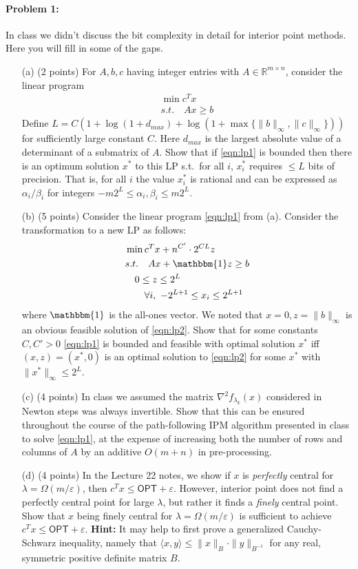 \documentclass[12pt]{article}
\newcommand{\inprod}[1]{\langle #1 \rangle}
\newcommand{\R}{\mathbb{R}}
\begin{document}
\paragraph{Problem 1:} In class we didn't discuss the bit complexity in detail for interior point methods. Here you will fill in some of the gaps.
\begin{itemize}
\item[(a)] (2 points) For $A, b, c$ having integer entries with $A\in\R^{m\times n}$, consider the linear program
\begin{eqnarray}
\nonumber \min c^T x  \\
s.t. \quad Ax \ge b \label{eqn:lp1}
\end{eqnarray}
Define $L = C(1 + \log(1 + d_{max}) + \log(1 + \max\{\|b\|_\infty, \|c\|_\infty\}))$ for sufficiently large constant $C$.  Here $d_{max}$ is the largest absolute value of a determinant of a submatrix of $A$. Show that if \eqref{eqn:lp1} is bounded then there is an optimum solution $x^*$ to this LP s.t.\ for all $i$, $x_i^*$ requires $\le L$ bits of precision. That is, for all $i$ the value  $x^*_i$ is rational and can be expressed as $\alpha_i/\beta_i$ for integers $-m 2^L \le \alpha_i, \beta_i \le m2^L$.
\item[(b)] (5 points) Consider the linear program \eqref{eqn:lp1} from (a). Consider the transformation to a new LP as follows:
\begin{eqnarray}
\nonumber &\min c^T x + n^{C'} \cdot 2^{C L} z  \\
\nonumber &s.t. \quad Ax + \mathbbm{1} z \ge b \\
\nonumber &\quad 0 \le z \le 2^L\\
&\quad \quad \forall i,\ -2^{L+1} \le x_i \le 2^{L+1}\label{eqn:lp2}
\end{eqnarray}
where $\mathbbm{1}$ is the all-ones vector. We noted that $x = 0, z = \|b\|_\infty$ is an obvious feasible solution of \eqref{eqn:lp2}. Show that for some constants $C, C' > 0$ \eqref{eqn:lp1} is bounded and feasible with optimal solution $x^*$ iff $(x, z) = (x^*, 0)$ is an optimal solution to \eqref{eqn:lp2} for some $x^*$ with $\|x^*\|_\infty \le 2^L$.
\item[(c)] (4 points) In class we assumed the matrix $\nabla^2 f_{\lambda_k}(x)$ considered in Newton steps was always invertible. Show that this can be ensured throughout the course of the path-following IPM algorithm presented in class to solve \eqref{eqn:lp1}, at the expense of increasing both the number of rows and columns of $A$ by an additive $O(m+n)$ in pre-processing.
\item[(d)] (4 points) In the Lecture 22 notes, we show if $x$ is {\em perfectly} central for $\lambda = \Omega(m/\varepsilon)$, then $c^Tx \le \mathsf{OPT} + \varepsilon$. However, interior point does not find a perfectly central point for large $\lambda$, but rather it finds a {\em finely} central point. Show that $x$ being finely central for $\lambda = \Omega(m/\varepsilon)$ is sufficient to achieve $c^T x \le \mathsf{OPT} + \varepsilon$. \textbf{Hint:} It may help to first prove a generalized Cauchy-Schwarz inequality, namely that $\inprod{x,y} \le \|x\|_B \cdot \|y\|_{B^{-1}}$ for any real, symmetric positive definite matrix $B$.
\end{itemize}
\end{document}
